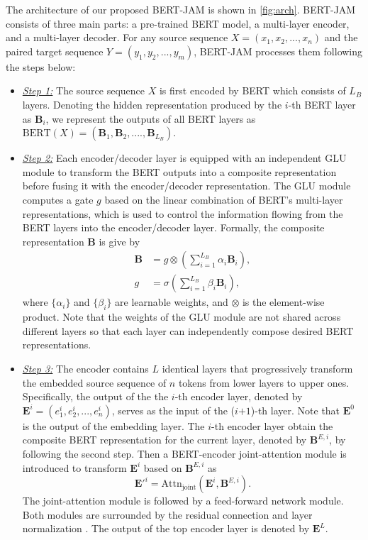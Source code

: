 \documentclass[review]{elsarticle}
\begin{document}
The architecture of our proposed BERT-JAM is shown in \cref{fig:arch}. BERT-JAM consists of three main parts: a pre-trained BERT model, a multi-layer encoder, and a multi-layer decoder. For any source sequence $X=(x_1, x_2, ..., x_n)$ and the paired target sequence $Y=(y_1, y_2, ..., y_m)$, BERT-JAM processes them following the steps below:

\begin{itemize}

\item \underline{\textit{Step 1:}} 
The source sequence $X$ is first encoded by BERT which consists of $L_B$ layers. Denoting the hidden representation produced by the $i$-th BERT layer as $\bm{B}_i$, we represent the outputs of all BERT layers as $\text{BERT}(X)=(\bm{B}_1, \bm{B}_2, ...., \bm{B}_{L_B})$.

\item \underline{\textit{Step 2:}} 
Each encoder/decoder layer is equipped with an independent GLU module to transform the BERT outputs into a composite representation before fusing it with the encoder/decoder representation. 
The GLU module computes a gate $g$ based on the linear combination of BERT's multi-layer representations, which is used to control the information flowing from the BERT layers into the encoder/decoder layer. Formally, the composite representation $\bm{B}$ is give by
\begin{equation}
    \label{eq:glu}
    \begin{aligned}
    \bm{B} & = g \otimes \left(\sum_{i=1}^{L_B}\alpha_i \bm{B}_i \right), \\
    g & =\sigma\left(\sum_{i=1}^{L_B}\beta_i \bm{B}_i \right),
    \end{aligned}
\end{equation}
where $\{\alpha_i\}$ and $\{\beta_i\}$ are learnable weights, and $\otimes$ is the element-wise product. Note that the weights of the GLU module are not shared across different layers so that each layer can independently compose desired BERT representations.

\item \underline{\textit{Step 3:}}
The encoder contains $L$ identical layers that progressively transform the embedded source sequence of $n$ tokens from lower layers to upper ones. Specifically, the output of the the $i$-th encoder layer, denoted by $\bm{E}^i=(e^i_1, e^i_2, ..., e^i_n)$, serves as the input of the ($i$$+$$1$)-th layer. Note that $\bm{E}^0$ is the output of the embedding layer.
The $i$-th encoder layer obtain the composite BERT representation for the current layer, denoted by $\bm{B}^{E, i}$, by following the second step. Then a BERT-encoder joint-attention module is introduced to transform $\bm{E}^i$ based on $\bm{B}^{E, i}$ as
\begin{equation}
    \label{eq:enc}
    \bm{E}'^i= \text{Attn}_{\text{joint}}(\bm{E}^i, \bm{B}^{E, i}).
\end{equation}
The joint-attention module is followed by a feed-forward network module. Both modules are surrounded by the residual connection \cite{He16} and layer normalization \cite{Ba16}. The output of the top encoder layer is denoted by $\bm{E}^L$.


\end{itemize}
\end{document}

